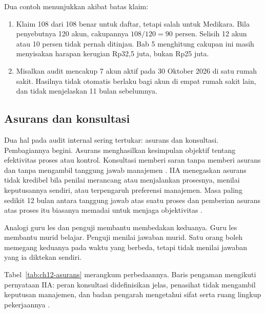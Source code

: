 Dua contoh menunjukkan akibat batas klaim:
\begin{enumerate}
  \item Klaim 108 dari 108 benar untuk daftar, tetapi salah untuk Medikara. Bila penyebutnya
  120 akun, cakupannya $108 / 120 = 90$ persen. Selisih 12 akun atau 10 persen tidak pernah
  ditinjau. Bab 5 menghitung cakupan ini masih menyisakan harapan kerugian Rp32,5 juta, bukan
  Rp25 juta.
  \item Misalkan audit mencakup 7 akun aktif pada 30 Oktober 2026 di satu rumah sakit. Hasilnya
  tidak otomatis berlaku bagi akun di empat rumah sakit lain, dan tidak menjelaskan 11 bulan
  sebelumnya.
\end{enumerate}

\subsection*{Asurans dan konsultasi}

Dua hal pada audit internal sering tertukar: asurans dan konsultasi. Pembagiannya begini.
Asurans menghasilkan kesimpulan objektif tentang efektivitas proses atau kontrol. Konsultasi
memberi saran tanpa memberi asurans dan tanpa mengambil tanggung jawab manajemen
\cite{iia-gias2024}. IIA menegaskan asurans tidak kredibel bila penilai merancang atau
menjalankan prosesnya, menilai keputusannya sendiri, atau terpengaruh preferensi manajemen. Masa
paling sedikit 12 bulan antara tanggung jawab atas suatu proses dan pemberian asurans atas
proses itu biasanya memadai untuk menjaga objektivitas \cite{iia-tlm2026}.

Analogi guru les dan penguji membantu membedakan keduanya. Guru les membantu murid belajar.
Penguji menilai jawaban murid. Satu orang boleh memegang keduanya pada waktu yang berbeda, tetapi
tidak menilai jawaban yang ia diktekan sendiri.

Tabel~\ref{tab:ch12-asurans} merangkum perbedaannya. Baris pengaman mengikuti pernyataan IIA:
peran konsultasi didefinisikan jelas, penasihat tidak mengambil keputusan manajemen, dan badan
pengarah mengetahui sifat serta ruang lingkup pekerjaannya \cite{iia-tlm2026}.

